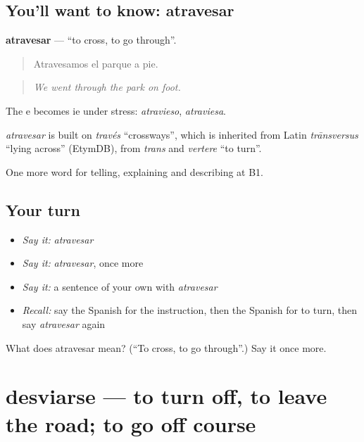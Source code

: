 \subsection*{You'll want to know: atravesar}
\textbf{atravesar} — \textquotedblleft{}to cross, to go through\textquotedblright{}.

\begin{quote}
Atravesamos el parque a pie.
\end{quote}

\begin{quote}
\emph{We went through the park on foot.}
\end{quote}

The e becomes ie under stress: \emph{atravieso}, \emph{atraviesa}.

\begin{cousinweb}
\emph{atravesar} is built on \emph{través} \textquotedblleft{}crossways\textquotedblright{}, which is inherited from Latin \emph{trānsversus} \textquotedblleft{}lying across\textquotedblright{} (EtymDB), from \emph{trans} and \emph{vertere} \textquotedblleft{}to turn\textquotedblright{}.
\end{cousinweb}

\begin{grammarlens}[title={What you've built}]
One more word for telling, explaining and describing at B1.
\end{grammarlens}

\subsection*{Your turn}
\begin{itemize}
\raggedright
  \item \emph{Say it:} \emph{atravesar}
  \item \emph{Say it:} \emph{atravesar}, once more
  \item \emph{Say it:} a sentence of your own with \emph{atravesar}
  \item \emph{Recall:} say the Spanish for the instruction, then the Spanish for to turn, then say \emph{atravesar} again
\end{itemize}

\begin{tcolorbox}[breakable,colback=teal!4,colframe=teal!35!black,title={Before you move on}]
What does atravesar mean? (\textquotedblleft{}To cross, to go through\textquotedblright{}.) Say it once more.
\end{tcolorbox}
\section[desviarse]{desviarse — to turn off, to leave the road; to go off course}

